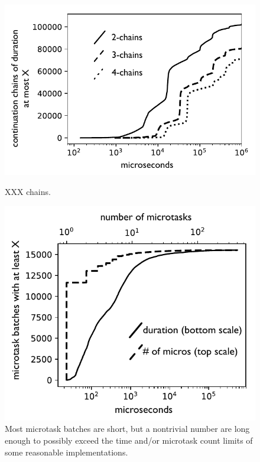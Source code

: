 \documentclass[acmsmall,anonymous,review]{acmart}\settopmatter{printfolios=true,printccs=false,printacmref=false}
\begin{document}
\begin{figure}
    \centering
    \begin{minipage}[t]{0.47\textwidth}
        \centering
        \includegraphics[width=1.0\textwidth]{Graphs/chains_bw}
        \caption{XXX chains.}
        \label{fig:graph_chains}
    \end{minipage}\hfill
    \begin{minipage}[t]{0.47\textwidth}
        \centering
        \includegraphics[width=1.0\textwidth]{micros_graph_bw}
        \caption{Most microtask batches are short, but a nontrivial number are long enough to possibly exceed the time and/or microtask count limits of some reasonable implementations.}
        \label{fig:graph_microtasks}
    \end{minipage}
\end{figure}
\end{document}
